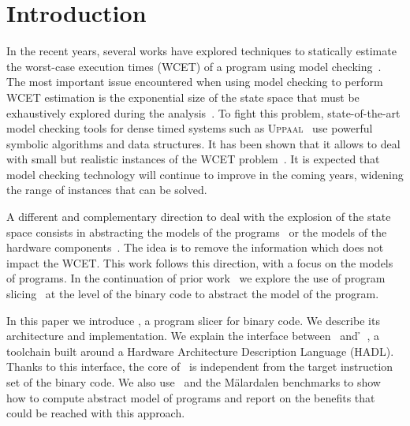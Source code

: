 \renewcommand{\baselinestretch}{1.2}
\section{Introduction}
\label{sec:introduction}

 
  In the recent years, several works have explored techniques to statically
  estimate the worst-case execution times (WCET) of a program using model
  checking~\cite{Gustavsson2010,DOT10,CB13}. The most important issue
  encountered when using model checking to perform WCET estimation is the
  exponential size of the state space that must be exhaustively explored during
  the analysis~\cite{Wil04}. To fight this problem, state-of-the-art model
  checking tools for dense timed systems such as \textsc{Uppaal}~\cite{LPY97}
  use powerful symbolic algorithms and data structures. It has been shown that
  it allows to deal with small but realistic instances of the WCET
  problem~\cite{Gustavsson2010,DOT10}. It is expected that model checking
  technology will continue to improve in the coming years, widening the range of
  instances that can be solved.

  A different and complementary direction to deal with the explosion of the
  state space consists in abstracting the models of the
  programs~\cite{CB13,Brandner2014} or the models of the hardware
  components~\cite{Cassez15}. The idea is to remove the information which does
  not impact the WCET. This work follows this direction, with a focus on the
  models of programs. In the continuation of prior work~\cite{CB13} we explore
  the use of program slicing~\cite{Wei81} at the level of the binary code to
  abstract the model of the program.

  In this paper we introduce \best, a program slicer for binary code. We
  describe its architecture and implementation. We explain the interface
  between \best\ and \h~\cite{KBB12}, a toolchain built around a Hardware
  Architecture Description Language (HADL). Thanks to this interface, the core
  of \best\ is independent from the target instruction set of the binary code.
  We also use \best\ and the Mälardalen benchmarks to show how to compute
  abstract model of programs and report on the benefits that could be reached
  with this approach.
  
